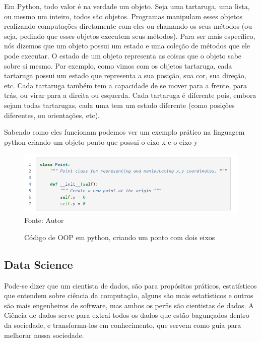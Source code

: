         Em Python, todo valor é na verdade um objeto. Seja uma tartaruga, uma lista, ou mesmo um inteiro, todos são objetos. Programas manipulam esses objetos realizando computações diretamente com eles ou chamando os seus métodos (ou seja, pedindo que esses objetos executem seus métodos). Para ser mais específico, nós dizemos que um objeto possui um estado e uma coleção de métodos que ele pode executar. O estado de um objeto representa as coisas que o objeto sabe sobre si mesmo. Por exemplo, como vimos com os objetos tartaruga, cada tartaruga possui um estado que representa a sua posição, sua cor, sua direção, etc. Cada tartaruga também tem a capacidade de se mover para a frente, para trás, ou virar para a direita ou esquerda. Cada tartaruga é diferente pois, embora sejam todas tartarugas, cada uma tem um estado diferente (como posições diferentes, ou orientações, etc).
        
        Sabendo como eles funcionam podemos ver um exemplo prático na linguagem python criando um objeto ponto que possui o eixo x e o eixo y
        
    \begin{figure}[H]
    \begin{center}
        \caption{Código de OOP em python, criando um ponto com dois eixos} \label{ling1}
        \includegraphics[width=12cm]{Pictures/poo-python.png} \\
        {\tiny \sf Fonte: Autor }
    \end{center}
   \end{figure}
        
        \newpage
        \subsection{ Data Science }
        
        Pode-se dizer que um cientista de dados, são para propósitos práticos, estatísticos que entendem sobre ciência da computação, alguns são mais estatísticos e outros são mais engenheiros de software, mas ambos os perfis são cientistas de dados.
        A Ciência de dados serve para extrai todos os dados que estão bagunçados dentro da sociedade, e transforma-los em conhecimento, que servem como guia para melhorar nossa sociedade.
        
